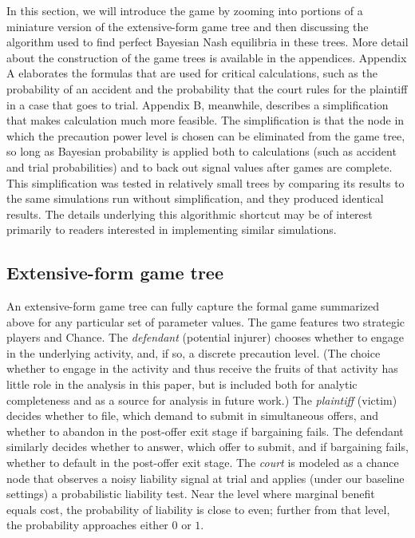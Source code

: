 \documentclass{article}
\begin{document}
In this section, we will introduce the game by zooming into portions of a miniature version of the extensive-form game tree and then discussing the algorithm used to find perfect Bayesian Nash equilibria in these trees. More detail about the construction of the game trees is available in the appendices. Appendix A elaborates the formulas that are used for critical calculations, such as the probability of an accident and the probability that the court rules for the plaintiff in a case that goes to trial. Appendix B, meanwhile, describes a simplification that makes calculation much more feasible. The simplification is that the node in which the precaution power level is chosen can be eliminated from the game tree, so long as Bayesian probability is applied both to calculations (such as accident and trial probabilities) and to back out signal values after games are complete. This simplification was tested in relatively small trees by comparing its results to the same simulations run without simplification, and they produced identical results. The details underlying this algorithmic shortcut may be of interest primarily to readers interested in implementing similar simulations.

\subsection{Extensive-form game tree}

An extensive-form game tree can fully capture the formal game summarized above for any particular set of parameter values. The game features two strategic players and Chance. The \emph{defendant} (potential injurer) chooses whether to engage in the underlying activity, and, if so, a discrete precaution level. (The choice whether to engage in the activity and thus receive the fruits of that activity has little role in the analysis in this paper, but is included both for analytic completeness and as a source for analysis in future work.) The \emph{plaintiff} (victim) decides whether to file, which demand to submit in simultaneous offers, and whether to abandon in the post-offer exit stage if bargaining fails. The defendant similarly decides whether to answer, which offer to submit, and if bargaining fails, whether to default in the post-offer exit stage. The \emph{court} is modeled as a chance node that observes a noisy liability signal at trial and applies (under our baseline settings) a probabilistic liability test. Near the level where marginal benefit equals cost, the probability of liability is close to even; further from that level, the probability approaches either $0$ or $1$.
\end{document}
